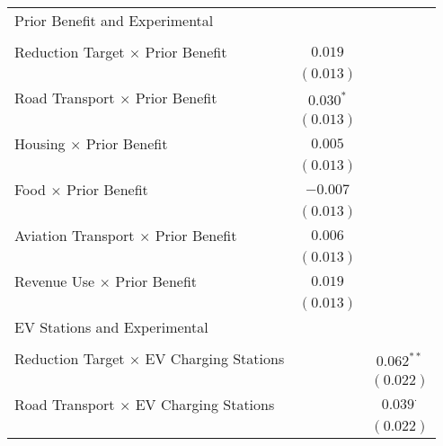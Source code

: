\begin{center}
\begin{tiny}
\begin{longtable}{l@{} c@{} c@{}}
Prior Benefit and Experimental                         &                  &                  \\
                                                       &                  &                  \\
\quad Reduction Target $\times$ Prior Benefit          & $0.019$          &                  \\
                                                       & $(0.013)$        &                  \\
\quad Road Transport $\times$ Prior Benefit            & $0.030^{*}$      &                  \\
                                                       & $(0.013)$        &                  \\
\quad Housing $\times$ Prior Benefit                   & $0.005$          &                  \\
                                                       & $(0.013)$        &                  \\
\quad Food $\times$ Prior Benefit                      & $-0.007$         &                  \\
                                                       & $(0.013)$        &                  \\
\quad Aviation Transport $\times$ Prior Benefit        & $0.006$          &                  \\
                                                       & $(0.013)$        &                  \\
\quad Revenue Use $\times$ Prior Benefit               & $0.019$          &                  \\
                                                       & $(0.013)$        &                  \\
EV Stations and Experimental                           &                  &                  \\
                                                       &                  &                  \\
\quad Reduction Target $\times$ EV Charging Stations   &                  & $0.062^{**}$     \\
                                                       &                  & $(0.022)$        \\
\quad Road Transport $\times$ EV Charging Stations     &                  & $0.039^{\cdot}$  \\
                                                       &                  & $(0.022)$        \\

\end{longtable}
\end{tiny}
\end{center}
